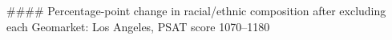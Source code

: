 #### Percentage-point change in racial/ethnic composition after excluding each Geomarket: Los Angeles, PSAT score 1070–1180
